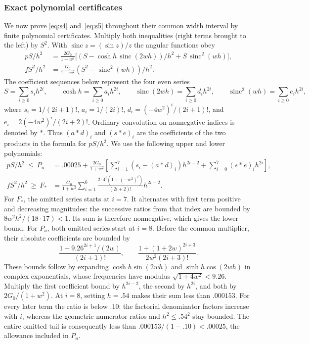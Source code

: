 \subsubsection{Exact polynomial certificates}
We now prove \eqref{eq:s4} and~\eqref{eq:s5} throughout their common width interval by finite polynomial certificates. Multiply both inequalities (right terms brought to the left) by $S^2$. With $\operatorname{sinc} z=(\sin z)/z$ the angular functions obey
\[
\begin{aligned}
 pS/h^2 &= \frac{2G_0}{1+w^2}
  \big[(S-\cosh h\,\operatorname{sinc}(2wh))/h^2+S\,\operatorname{sinc}^2(wh)\big],\\
 f S^2/h^2 &= \frac{G_0}{1+w^2}(S^2-\operatorname{sinc}^2(wh))/h^2 .
\end{aligned}
\]
The coefficient sequences below represent the four even series
\[
 S=\sum_{i\ge0}s_i h^{2i},\qquad
 \cosh h=\sum_{i\ge0}a_i h^{2i},\qquad
 \operatorname{sinc}(2wh)=\sum_{i\ge0}d_i h^{2i},\qquad
 \operatorname{sinc}^2(wh)=\sum_{i\ge0}e_i h^{2i},
\]
where $s_i=1/(2i+1)!$, $a_i=1/(2i)!$, $d_i=(-4w^2)^i/(2i+1)!$, and $e_i=2(-4w^2)^i/(2i+2)!$. Ordinary convolution on nonnegative indices is denoted by $*$. Thus $(a*d)_i$ and $(s*e)_i$ are the coefficients of the two products in the formula for $pS/h^2$. We use the following upper and lower polynomials:
\[
\begin{aligned}
 pS/h^2\ \le\ P_u&=.00025+\frac{2G_0}{1+w^2}
   \left[\sum_{i=1}^7(s_i-(a*d)_i)h^{2i-2}+\sum_{i=0}^7(s*e)_i h^{2i}\right],\\
 f S^2/h^2\ \ge\ F_*&=\frac{G_0}{1+w^2}\sum_{i=1}^6
         \frac{2\cdot4^i(1-(-w^2)^i)}{(2i+2)!}h^{2i-2}.
\end{aligned}
\]
For $F_*$, the omitted series starts at $i=7$. It alternates with first term positive and decreasing magnitudes: the successive ratios from that index are bounded by $8w^2h^2/(18\cdot17)<1$. Its sum is therefore nonnegative, which gives the lower bound. For $P_u$, both omitted series start at $i=8$. Before the common multiplier, their absolute coefficients are bounded by
\[
 \frac{1+9.26^{2i+1}/(2w)}{(2i+1)!},\qquad
 \frac{1+(1+2w)^{2i+3}}{2w^2(2i+3)!}.
\]
These bounds follow by expanding $\cosh h\sin(2wh)$ and $\sinh h\cos(2wh)$ in complex exponentials, whose frequencies have modulus $\sqrt{1+4w^2}<9.26$. Multiply the first coefficient bound by $h^{2i-2}$, the second by $h^{2i}$, and both by $2G_0/(1+w^2)$. At $i=8$, setting $h=.54$ makes their sum less than $.000153$. For every later term the ratio is below $.10$: the factorial denominator factors increase with $i$, whereas the geometric numerator ratios and $h^2\le.54^2$ stay bounded. The entire omitted tail is consequently less than $.000153/(1-.10)<.00025$, the allowance included in $P_u$.

